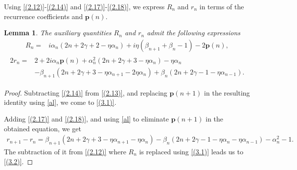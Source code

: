 \documentclass[11pt,a4paper]{article}
\newtheorem{lemma}[theorem]{Lemma}
\numberwithin{equation}{section}
\begin{document}
Using \eqref{(2.12)}-\eqref{(2.14)} and \eqref{(2.17)}-\eqref{(2.18)}, we express $R_n$ and $r_n$ in terms of the recurrence coefficients and $\textbf{p}(n)$.

\begin{lemma}
	The auxiliary quantities $R_{n}$ and $r_{n}$ admit the following expressions
	\begin{align}
R_{n}=&\mathit{i}\alpha_{n}(2n+2\gamma+2-\eta\alpha_{n})+\mathit{i}\eta(\beta_{n+1}+\beta_{n}-1)-2\textbf{p}(n), \label{(3.1)}
\end{align}
\begin{align}
		\begin{split}
2r_{n}=&2+2\mathit{i}\alpha_{n}\textbf{p}(n)+\alpha_{n}^{2}(2n+2\gamma+3-\eta\alpha_{n})-\eta\alpha_{n}\\
&-\beta_{n+1}(2n+2\gamma+3-\eta\alpha_{n+1}-2\eta\alpha_{n})+\beta_{n}(2n+2\gamma-1-\eta\alpha_{n-1}).\label{(3.2)}
		\end{split}
	\end{align}
\end{lemma}

\begin{proof}
Subtracting \eqref{(2.14)} from \eqref{(2.13)}, and replacing $\textbf{p}(n+1)$ in the resulting identity using \eqref{al}, we come to \eqref{(3.1)}.

Adding \eqref{(2.17)} and \eqref{(2.18)}, and using \eqref{al} to eliminate $\textbf{p}(n+1)$ in the obtained equation, we get
\begin{align}\label{s2-4}
r_{n+1}-r_{n}=\beta_{n+1}\left(2n+2\gamma+3-\eta\alpha_{n+1}-\eta\alpha_{n}\right)-\beta_{n}\left(2n+2\gamma-1-\eta\alpha_{n}-\eta\alpha_{n-1}\right)-\alpha_{n}^{2}-1.
\end{align}	
The subtraction of it from \eqref{(2.12)} where $R_n$ is replaced using \eqref{(3.1)} leads us to \eqref{(3.2)}.
\end{proof}
\end{document}
